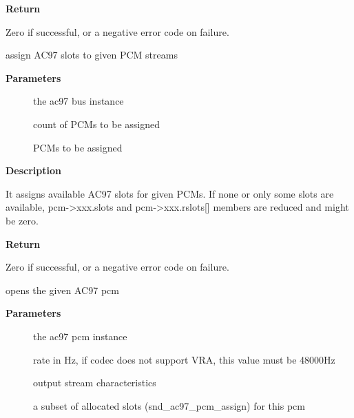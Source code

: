 \documentclass[a4paper,8pt,english]{sphinxmanual}
\begin{document}
\textbf{Return}

Zero if successful, or a negative error code on failure.

\begin{fulllineitems}
\label{sound/kernel-api/alsa-driver-api:c.snd_ac97_pcm_assign}
assign AC97 slots to given PCM streams

\end{fulllineitems}


\textbf{Parameters}
\begin{description}
\item[{}] \leavevmode
the ac97 bus instance

\item[{}] \leavevmode
count of PCMs to be assigned

\item[{}] \leavevmode
PCMs to be assigned

\end{description}

\textbf{Description}

It assigns available AC97 slots for given PCMs. If none or only
some slots are available, pcm-\textgreater{}xxx.slots and pcm-\textgreater{}xxx.rslots{[}{]} members
are reduced and might be zero.

\textbf{Return}

Zero if successful, or a negative error code on failure.

\begin{fulllineitems}
\label{sound/kernel-api/alsa-driver-api:c.snd_ac97_pcm_open}
opens the given AC97 pcm

\end{fulllineitems}


\textbf{Parameters}
\begin{description}
\item[{}] \leavevmode
the ac97 pcm instance

\item[{}] \leavevmode
rate in Hz, if codec does not support VRA, this value must be 48000Hz

\item[{}] \leavevmode
output stream characteristics

\item[{}] \leavevmode
a subset of allocated slots (snd\_ac97\_pcm\_assign) for this pcm

\end{description}
\end{document}

